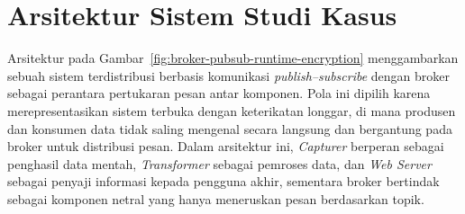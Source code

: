 \section{Arsitektur Sistem Studi Kasus}

Arsitektur pada Gambar~\ref{fig:broker-pubsub-runtime-encryption} menggambarkan sebuah sistem terdistribusi berbasis komunikasi \emph{publish--subscribe} dengan broker sebagai perantara pertukaran pesan antar komponen. Pola ini dipilih karena merepresentasikan sistem terbuka dengan keterikatan longgar, di mana produsen dan konsumen data tidak saling mengenal secara langsung dan bergantung pada broker untuk distribusi pesan. Dalam arsitektur ini, \emph{Capturer} berperan sebagai penghasil data mentah, \emph{Transformer} sebagai pemroses data, dan \emph{Web Server} sebagai penyaji informasi kepada pengguna akhir, sementara broker bertindak sebagai komponen netral yang hanya meneruskan pesan berdasarkan topik.

